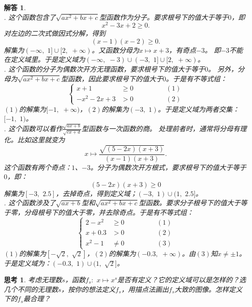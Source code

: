 \documentclass[12pt,UTF8]{ctexbook}
\newtheorem{sk}{思考}[section]
\newtheorem*{so}{解答}
\begin{document}
\begin{so}
    \mbox{}\\
    . 这个函数包含了$\sqrt{ax^2 + bx + c}$型函数作为分子。要求根号下的值大于等于$0$，即
    $$ x^2 - 3x + 2 \geqslant 0.$$
    对左边的二次式做因式分解，得到
    $$ (x - 1)(x - 2) \geqslant 0.$$
    解集为$(-\infty, \,\, 1]\cup[2, \,\, +\infty)$。又函数分母为$x\mapsto x + 3$，有奇点$-3$。
    即$-3$不能在定义域里。于是定义域为$(-\infty,\,\,  -3)\cup(-3, \,\, 1]\cup[2,\,\,  +\infty)$。\\
    . 这个函数的分子为偶数次开方无理函数，要求根号下的值大于等于$0$。
    另外，分母为$\sqrt{ax^2 + bx + c}$型函数，因此要求根号下的值大于$0$。于是有不等式组：
    $$\left\{\begin{array}{ccr}
        x + 1 &\geqslant 0 & \quad\quad\quad\quad (1) \\
        - x^2 - 2x + 3 &> 0  & \quad\quad\quad\quad (2)
    \end{array}\right.$$
    $(1)$的解集为$[-1,\,\, +\infty)$，$(2)$的解集为$(-3,\,\,  1)$。于是定义域为两者交集：$[-1,\,\,  1)$。\\
    . 这个函数可以看作$\frac{\sqrt{ax + b}}{\sqrt{cx + d}}$型函数与一次函数的商。
    处理前者时，通常将分母有理化。比如这里就变为
    $$ x \mapsto \frac{\sqrt{(5 - 2x)(x + 3)}}{(x - 1)(x + 3)}. $$
    这个函数有两个奇点：$1$、$-3$。分子为偶数次开方根式，要求根号下的值大于等于$0$，即：
    $$ (5 - 2x)(x + 3) \geqslant 0$$
    解集为$[-3, \,\, 2.5]$，去掉奇点，得到定义域；$(-3, \,\, 1)\cup(1, \,\, 2.5]$。\\
    . 这个函数涉及了$\sqrt{ax + b}$型和$\sqrt{ax^2 + bx + c}$型函数。要求分子根号下的值大于等于零，分母根号下的值大于零，并去除奇点。于是有不等式组：
    $$\left\{\begin{array}{ccr}
        2 - x^2 &\geqslant 0 & \quad\quad\quad\quad (1) \\
        x + 0.3 &> 0  & \quad\quad\quad\quad (2) \\
        x^2 - 1 &\neq 0 & \quad\quad\quad\quad (3) 
    \end{array}\right.$$
    $(1)$的解集为$[-\sqrt{2}, \,\, \sqrt{2}]$，$(2)$的解集为$(-0.3,\,\,  +\infty)$。由$(3)$知$x\neq \pm 1$。
    于是定义域为：$(-0.3, \,\, 1)\cup(1, \,\, \sqrt{2}]$。
\end{so}
\begin{sk}
    考虑无理数$s$，函数$f_s: \,\, x\mapsto x^s$是否有定义？它的定义域可以是怎样的？选几个不同的无理数$s$，按你的想法定义$f_s$，用描点法画出$f_s$大致的图像。怎样定义下的$f_s$最合理？
\end{sk}
\end{document}
